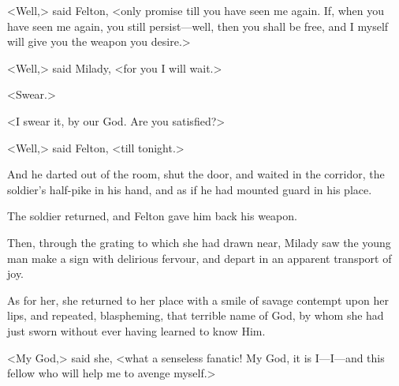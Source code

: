 <Well,> said Felton, <only promise till you have seen me again. If, when you have seen me again, you still persist—well, then you shall be free, and I myself will give you the weapon you desire.> 

<Well,> said Milady, <for you I will wait.> 

<Swear.> 

<I swear it, by our God. Are you satisfied?> 

<Well,> said Felton, <till tonight.> 

And he darted out of the room, shut the door, and waited in the corridor, the soldier's half-pike in his hand, and as if he had mounted guard in his place. 

The soldier returned, and Felton gave him back his weapon. 

Then, through the grating to which she had drawn near, Milady saw the young man make a sign with delirious fervour, and depart in an apparent transport of joy. 

As for her, she returned to her place with a smile of savage contempt upon her lips, and repeated, blaspheming, that terrible name of God, by whom she had just sworn without ever having learned to know Him. 

<My God,> said she, <what a senseless fanatic! My God, it is I—I—and this fellow who will help me to avenge myself.> 